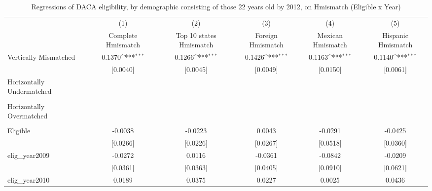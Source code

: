\begin{table}[htbp]\centering
\def\sym#1{\ifmmode^{#1}\else\(^{#1}\)\fi}
\caption{Regressions of DACA eligibility, by demographic consisting of those 22 years old by 2012, on Hmismatch (Eligible x Year)}
\begin{tabular}{l*{5}{c}}
\toprule
                    &\multicolumn{1}{c}{(1)}         &\multicolumn{1}{c}{(2)}         &\multicolumn{1}{c}{(3)}         &\multicolumn{1}{c}{(4)}         &\multicolumn{1}{c}{(5)}         \\
                    &Complete Hmismatch         &Top 10 states Hmismatch         &Foreign Hmismatch         &Mexican Hmismatch         &Hispanic Hmismatch         \\
\midrule
Vertically Mismatched&      0.1370\sym{***}&      0.1266\sym{***}&      0.1426\sym{***}&      0.1163\sym{***}&      0.1140\sym{***}\\
                    &    [0.0040]         &    [0.0045]         &    [0.0049]         &    [0.0150]         &    [0.0061]         \\
\addlinespace
Horizontally Undermatched&                     &                     &                     &                     &                     \\
                    &                     &                     &                     &                     &                     \\
\addlinespace
Horizontally Overmatched&                     &                     &                     &                     &                     \\
                    &                     &                     &                     &                     &                     \\
\addlinespace
Eligible            &     -0.0038         &     -0.0223         &      0.0043         &     -0.0291         &     -0.0425         \\
                    &    [0.0266]         &    [0.0226]         &    [0.0267]         &    [0.0518]         &    [0.0360]         \\
\addlinespace
elig\_year2009       &     -0.0272         &      0.0116         &     -0.0361         &     -0.0842         &     -0.0209         \\
                    &    [0.0361]         &    [0.0363]         &    [0.0405]         &    [0.0910]         &    [0.0621]         \\
\addlinespace
elig\_year2010       &      0.0189         &      0.0375         &      0.0227         &      0.0025         &      0.0436         \\

\end{tabular}
\end{table}
